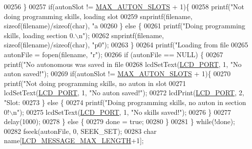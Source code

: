 \begin{DoxyCode}
{{{{{{{{{{{{{{{{{{{{{{{{{{{{00256         \}
00257         \textcolor{keywordflow}{if}(autonSlot != \hyperlink{autonrecorder_8h_a5173a11a545cb4020fdd139552dc15c1}{MAX\_AUTON\_SLOTS} + 1)\{
00258             printf(\textcolor{stringliteral}{"Not doing programming skills, loading slot %
00259             snprintf(filename, \textcolor{keyword}{sizeof}(filename)/\textcolor{keyword}{sizeof}(\textcolor{keywordtype}{char}), \textcolor{stringliteral}{"a%
00260         \} \textcolor{keywordflow}{else} \{
00261             printf(\textcolor{stringliteral}{"Doing programming skills, loading section 0.\(\backslash\)n"});
00262             snprintf(filename, \textcolor{keyword}{sizeof}(filename)/\textcolor{keyword}{sizeof}(\textcolor{keywordtype}{char}), \textcolor{stringliteral}{"p0"});
00263         \}
00264         printf(\textcolor{stringliteral}{"Loading from file %
00265         autonFile = fopen(filename, \textcolor{stringliteral}{"r"});
00266         \textcolor{keywordflow}{if} (autonFile == NULL) \{
00267             printf(\textcolor{stringliteral}{"No autonomous was saved in file %
00268             lcdSetText(\hyperlink{lcdmsg_8h_abcf42bd88b3c36193f301ca25b033875}{LCD\_PORT}, 1, \textcolor{stringliteral}{"No auton saved!"});
00269             \textcolor{keywordflow}{if}(autonSlot != \hyperlink{autonrecorder_8h_a5173a11a545cb4020fdd139552dc15c1}{MAX\_AUTON\_SLOTS} + 1)\{
00270                 printf(\textcolor{stringliteral}{"Not doing programming skills, no auton in slot %
00271                 lcdSetText(\hyperlink{lcdmsg_8h_abcf42bd88b3c36193f301ca25b033875}{LCD\_PORT}, 1, \textcolor{stringliteral}{"No auton saved!"});
00272                 lcdPrint(\hyperlink{lcdmsg_8h_abcf42bd88b3c36193f301ca25b033875}{LCD\_PORT}, 2,   \textcolor{stringliteral}{"Slot: %
00273             \} \textcolor{keywordflow}{else} \{
00274                 printf(\textcolor{stringliteral}{"Doing programming skills, no auton in section 0!\(\backslash\)n"});
00275                 lcdSetText(\hyperlink{lcdmsg_8h_abcf42bd88b3c36193f301ca25b033875}{LCD\_PORT}, 1, \textcolor{stringliteral}{"No skills saved!"});
00276             \}
00277             delay(1000);
00278         \} \textcolor{keywordflow}{else} \{
00279             done = \textcolor{keyword}{true};
00280         \}
00281     \} \textcolor{keywordflow}{while}(!done);
00282     fseek(autonFile, 0, SEEK\_SET);
00283     \textcolor{keywordtype}{char} name[\hyperlink{lcdmsg_8h_abe4c4b70fc6f44ae3680e5b2c68cdd00}{LCD\_MESSAGE\_MAX\_LENGTH}+1];
}}}}}}}}}}}}}}}}}}}}}}}}}}}}}}}}}}
\end{DoxyCode}
